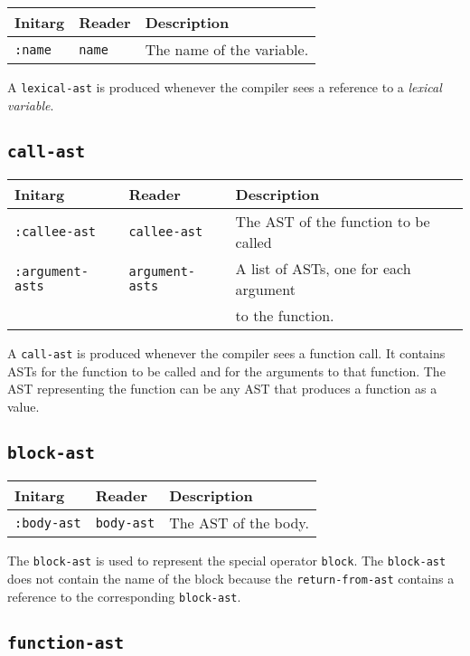\begin{tabular}{|l|l|l|}
\hline
Initarg & Reader & Description\\
\hline\hline
\texttt{:name} & \texttt{name} & The name of the variable.\\  
\hline
\end{tabular}

A \texttt{lexical-ast} is produced whenever the compiler sees a
reference to a \emph{lexical variable}. 

\subsection{\texttt{call-ast}}
\label{call-ast}

\begin{tabular}{|l|l|l|}
\hline
Initarg & Reader & Description\\
\hline\hline
\texttt{:callee-ast} & \texttt{callee-ast} & The AST of the function
to be called\\  
\hline
\texttt{:argument-asts} & \texttt{argument-asts} & A list of ASTs, one
for each argument\\
& & to the function.\\
\hline
\end{tabular}

A \texttt{call-ast} is produced whenever the compiler sees a function
call.  It contains ASTs for the function to be called and for the
arguments to that function.  The AST representing the function can be
any AST that produces a function as a value.

\subsection{\texttt{block-ast}}
\label{block-ast}

\begin{tabular}{|l|l|l|}
\hline
Initarg & Reader & Description\\
\hline\hline
\texttt{:body-ast} & \texttt{body-ast} & The AST of the body.\\
\hline
\end{tabular}

The \texttt{block-ast} is used to represent the \cl{} special operator
\texttt{block}.  The \texttt{block-ast} does not contain the name of
the block because the \texttt{return-from-ast} contains a reference to
the corresponding \texttt{block-ast}.

\subsection{\texttt{function-ast}}
\label{function-ast}

